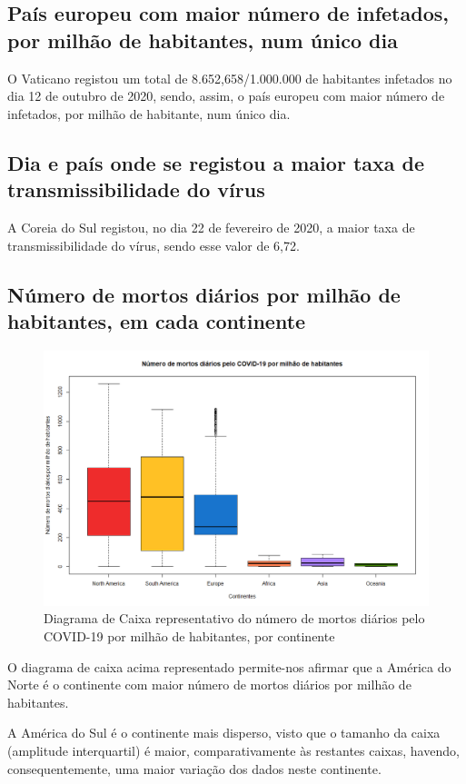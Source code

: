 \documentclass[conference]{IEEEtran}
\begin{document}
\subsection{País europeu com maior número de infetados, por milhão de habitantes, num único dia}
O Vaticano registou um total de 8.652,658/1.000.000 de habitantes infetados no dia 12 de outubro de 2020, sendo, assim, o país europeu com maior número de infetados, por milhão de habitante, num único dia. 

\subsection{Dia e país onde se registou a maior taxa de transmissibilidade do vírus}
A Coreia do Sul registou, no dia 22 de fevereiro de 2020, a maior taxa de transmissibilidade do vírus, sendo esse valor de 6,72. 

\subsection{Número de mortos diários por milhão de habitantes, em cada continente}

\begin{figure}[htbp]
\centerline{\includegraphics[width=0.95\columnwidth]{images/01.g.png}}
\caption{Diagrama de Caixa representativo do número de mortos diários pelo COVID-19 por milhão de habitantes, por continente}
\label{fig}
\end{figure}

O diagrama de caixa acima representado permite-nos afirmar que a América do Norte é o continente com maior número de mortos diários por milhão de habitantes.

A América do Sul é o continente mais disperso, visto que o tamanho da caixa (amplitude interquartil) é maior, comparativamente às restantes caixas, havendo, consequentemente, uma maior variação dos dados neste continente.
\end{document}
